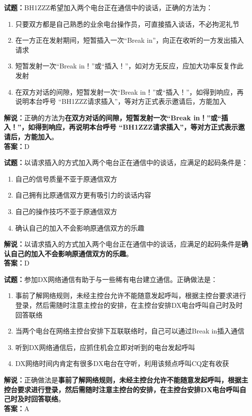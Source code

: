 \documentclass{ctexbook}
\begin{document}
\vspace{1em}

\textbf{试题：}BH1ZZZ希望加入两个电台正在通信中的谈话，正确的方法为：
\begin{enumerate}[leftmargin=3em]
  \item 只要双方都是自己熟悉的业余电台操作员，可直接插入谈话，不必拘泥礼节
  \item 在一方正在发射期间，短暂插入一次“Break in”，向正在收听的一方发出插入请求
  \item 短暂发射一次“Break in！”或“插入！”，如对方无反应，应加大功率反复作此发射
  \item 在双方对话的间隙，短暂发射一次“Break in！”或“插入！”，如得到响应，再说明本台呼号 “BH1ZZZ请求插入”，等对方正式表示邀请后，方能加入
\end{enumerate}
\noindent\textbf{解说：}正确的方法为\textbf{在双方对话的间隙，短暂发射一次“Break in！”或“插入！”，如得到响应，再说明本台呼号 “BH1ZZZ请求插入”，等对方正式表示邀请后，方能加入}。\\\noindent\textbf{答案：}D

\vspace{1em}

\textbf{试题：}以请求插入的方式加入两个电台正在通信中的谈话，应满足的起码条件是：
\begin{enumerate}[leftmargin=3em]
  \item 自己的信号质量不亚于原通信双方
  \item 自己拥有比原通信双方更有吸引力的谈话内容
  \item 自己的操作技巧不亚于原通信双方
  \item 确认自己的加入不会影响原通信双方的乐趣
\end{enumerate}
\noindent\textbf{解说：}以请求插入的方式加入两个电台正在通信中的谈话，应满足的起码条件是\textbf{确认自己的加入不会影响原通信双方的乐趣}。\\\noindent\textbf{答案：}D

\vspace{1em}

\textbf{试题：}参加DX网络通信有助于与一些稀有电台建立通信。正确做法是：
\begin{enumerate}[leftmargin=3em]
  \item 事前了解网络规则，未经主控台允许不能随意发起呼叫，根据主控台要求进行登录，然后需随时注意主控台的安排，在主控台安排DX电台呼叫自己时及时回答联络
  \item 当两个电台在网络主控台安排下互联联络时，自己可以通过Break in插入通信
  \item 听到DX网络通信后，应抓住机会立即对听到的电台发起呼叫
  \item DX网络时间内肯定有很多DX电台在守听，利用该频点呼叫CQ定有收获
\end{enumerate}
\noindent\textbf{解说：}正确做法是\textbf{事前了解网络规则，未经主控台允许不能随意发起呼叫，根据主控台要求进行登录，然后需随时注意主控台的安排，在主控台安排DX电台呼叫自己时及时回答联络}。\\\noindent\textbf{答案：}A
\end{document}
